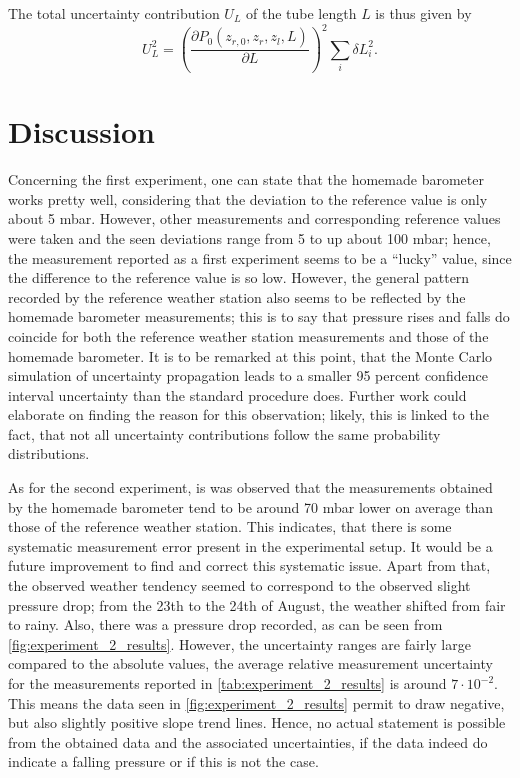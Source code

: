 \documentclass[a4paper,11pt, twocolumn]{article}
\begin{document}
The total uncertainty contribution $U_{L}$ of the tube length $L$ is thus given by \begin{equation}
	U_{L}^2 = \left(\frac{\partial P_0(z_{r,0}, z_r, z_l, L)}{\partial L}\right)^2\sum_{i}\delta L_{i}^2.
\end{equation}

\section{Discussion}
Concerning the first experiment, one can state that the homemade barometer works pretty well, considering that the deviation to the reference value is only about 5 mbar. However, other measurements and corresponding reference values were taken and the seen deviations range from 5 to up about 100 mbar; hence, the measurement reported as a first experiment seems to be a ``lucky'' value, since the difference to the reference value is so low. However, the general pattern recorded by the reference weather station also seems to be reflected by the homemade barometer measurements; this is to say that pressure rises and falls do coincide for both the reference weather station measurements and those of the homemade barometer. It is to be remarked at this point, that the Monte Carlo simulation of uncertainty propagation leads to a smaller 95 percent confidence interval uncertainty than the standard procedure does. Further work could elaborate on finding the reason for this observation; likely, this is linked to the fact, that not all uncertainty contributions follow the same probability distributions.

As for the second experiment, is was observed that the measurements obtained by the homemade barometer tend to be around 70 mbar lower on average than those of the reference weather station. This indicates, that there is some systematic measurement error present in the experimental setup. It would be a future improvement to find and correct this systematic issue. Apart from that, the observed weather tendency seemed to correspond to the observed slight pressure drop; from the 23th to the 24th of August, the weather shifted from fair to rainy. Also, there was a pressure drop recorded, as can be seen from \cref{fig:experiment_2_results}. However, the uncertainty ranges are fairly large compared to the absolute values, the average relative measurement uncertainty for the measurements reported in \cref{tab:experiment_2_results} is around $7\cdot 10^{-2}$. This means the data seen in \cref{fig:experiment_2_results} permit to draw negative, but also slightly positive slope trend lines. Hence, no actual statement is possible from the obtained data and the associated uncertainties, if the data indeed do indicate a falling pressure or if this is not the case.
\end{document}
